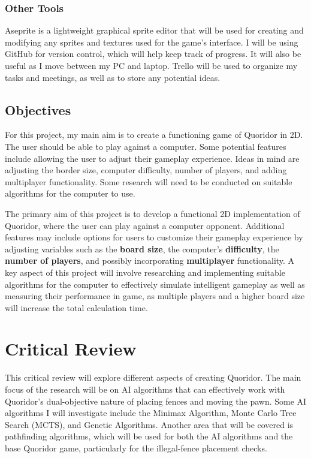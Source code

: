 \documentclass[review]{cmpreport}
\begin{document}
\subsubsection{Other Tools}
Aseprite is a lightweight graphical sprite editor that will be used for creating and modifying any sprites and textures used for the game's interface. I will be using GitHub for version control, which will help keep track of progress. It will also be useful as I move between my PC and laptop. Trello will be used to organize my tasks and meetings, as well as to store any potential ideas.

\subsection{Objectives}
For this project, my main aim is to create a functioning game of Quoridor in 2D. The user should be able to play against a computer. Some potential features include allowing the user to adjust their gameplay experience. Ideas in mind are adjusting the border size, computer difficulty, number of players, and adding multiplayer functionality. Some research will need to be conducted on suitable algorithms for the computer to use.
\newline

\noindent The primary aim of this project is to develop a functional 2D implementation of Quoridor, where the user can play against a computer opponent. Additional features may include options for users to customize their gameplay experience by adjusting variables such as the \textbf{board size}, the computer's \textbf{difficulty}, the \textbf{number of players}, and possibly incorporating \textbf{multiplayer} functionality. A key aspect of this project will involve researching and implementing suitable algorithms for the computer to effectively simulate intelligent gameplay as well as measuring their performance in game, as multiple players and a higher board size will increase the total calculation time.

\section{Critical Review}
This critical review will explore different aspects of creating Quoridor. The main focus of the research will be on AI algorithms that can effectively work with Quoridor's dual-objective nature of placing fences and moving the pawn. Some AI algorithms I will investigate include the Minimax Algorithm, Monte Carlo Tree Search (MCTS), and Genetic Algorithms. Another area that will be covered is pathfinding algorithms, which will be used for both the AI algorithms and the base Quoridor game, particularly for the illegal-fence placement checks.
\end{document}
